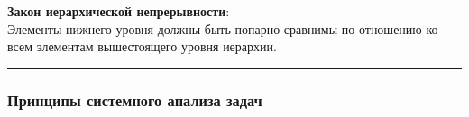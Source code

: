 \documentclass[
]{article}
\begin{document}
\textbf{Закон иерархической непрерывности}:\\
Элементы нижнего уровня должны быть попарно сравнимы по отношению ко
всем элементам вышестоящего уровня иерархии.

\begin{center}\rule{0.5\linewidth}{0.5pt}\end{center}

\subsubsection{\texorpdfstring{\textbf{Принципы системного анализа
задач}}{Принципы системного анализа задач}}\label{ux43fux440ux438ux43dux446ux438ux43fux44b-ux441ux438ux441ux442ux435ux43cux43dux43eux433ux43e-ux430ux43dux430ux43bux438ux437ux430-ux437ux430ux434ux430ux447}
\end{document}
